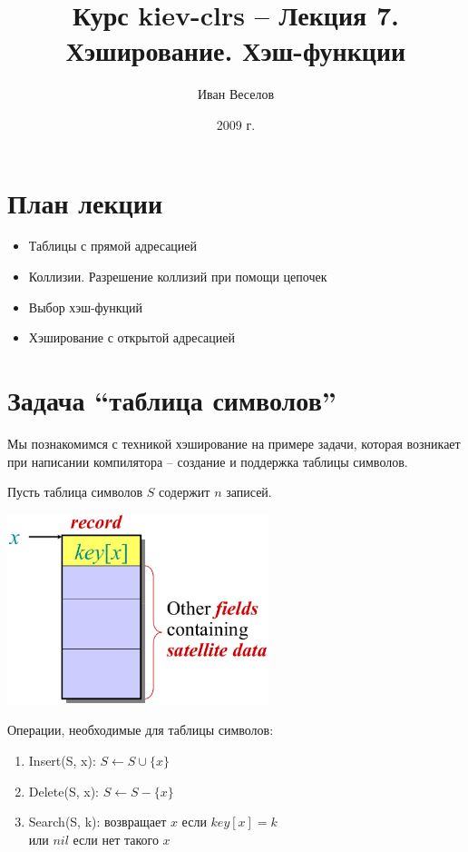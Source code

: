 \documentclass[a4paper,11pt]{article}
\author{Иван Веселов}
\title{Курс kiev-clrs -- Лекция 7. Хэширование. Хэш-функции}
\date{2009 г.}
\begin{document}
\maketitle
\tableofcontents
\newpage

\setlength{\parskip}{1ex plus 0.5ex minus 0.2ex}

\section{План лекции}
\begin{itemize}
\item Таблицы с прямой адресацией
\item Коллизии. Разрешение коллизий при помощи цепочек
\item Выбор хэш-функций
\item Хэширование с открытой адресацией
\end{itemize}

\section{Задача ``таблица символов''}
Мы познакомимся с техникой хэширование на примере задачи, которая возникает при
написании компилятора -- создание и поддержка таблицы символов.

Пусть таблица символов $S$ содержит $n$ записей.

\begin{center}
\includegraphics[width=3in]{lecture7/record.eps}
\end{center}

Операции, необходимые для таблицы символов:
\begin{enumerate}
\item Insert(S, x): $S \gets S \cup \lbrace x \rbrace$
\item Delete(S, x): $S \gets S - \lbrace x \rbrace$
\item Search(S, k): возвращает $x$ если $key[x] = k$ \\
  или $nil$ если нет такого $x$
\end{enumerate}
\end{document}
